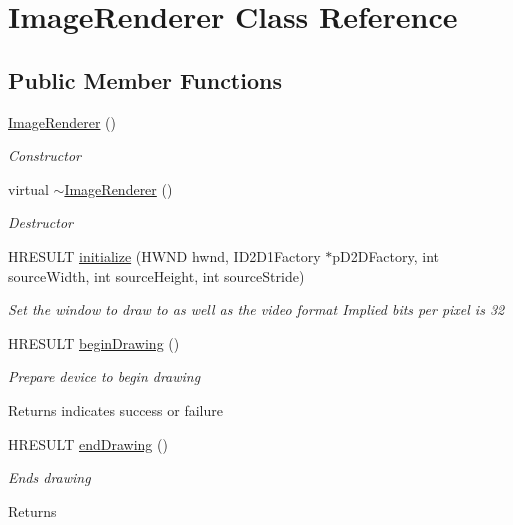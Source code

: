 \hypertarget{class_image_renderer}{}\section{Image\+Renderer Class Reference}
\label{class_image_renderer}
\subsection*{Public Member Functions}
\begin{DoxyCompactItemize}
\item 
\hyperlink{class_image_renderer_a1550e980cb6121c21e5f554628b9c7e6}{Image\+Renderer} ()
\begin{DoxyCompactList}\small\item\em Constructor \end{DoxyCompactList}\item 
virtual \hyperlink{class_image_renderer_a98d1587d310a17eca400e99b56d9b5c1}{$\sim$\+Image\+Renderer} ()
\begin{DoxyCompactList}\small\item\em Destructor \end{DoxyCompactList}\item 
H\+R\+E\+S\+U\+L\+T \hyperlink{class_image_renderer_a28d70ffb64d4c48cfb1ff67ef54f13a8}{initialize} (H\+W\+N\+D hwnd, I\+D2\+D1\+Factory $\ast$p\+D2\+D\+Factory, int source\+Width, int source\+Height, int source\+Stride)
\begin{DoxyCompactList}\small\item\em Set the window to draw to as well as the video format Implied bits per pixel is 32 \end{DoxyCompactList}\item 
H\+R\+E\+S\+U\+L\+T \hyperlink{class_image_renderer_a65a85272d88da1cb9460b3c9470bad0a}{begin\+Drawing} ()
\begin{DoxyCompactList}\small\item\em Prepare device to begin drawing \begin{DoxyReturn}{Returns}
indicates success or failure
\end{DoxyReturn}
\end{DoxyCompactList}\item 
H\+R\+E\+S\+U\+L\+T \hyperlink{class_image_renderer_a0fc06bcef542acbb8d6d1051887b1c58}{end\+Drawing} ()
\begin{DoxyCompactList}\small\item\em Ends drawing \begin{DoxyReturn}{Returns}

\end{DoxyReturn}
\end{DoxyCompactList}
\end{DoxyCompactItemize}
